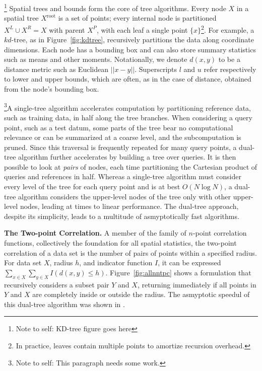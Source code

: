 \documentclass[times, leqno,twocolumn]{article}
\newcommand{\authornote}[1]{\footnote{Note to self: #1}}
\newcommand{\union}{\cup}
\newcommand{\fig}[1]{Figure~\ref{fig:#1}}
\newcommand{\kdroot}[1]{#1^{\text{root}}}
\newcommand{\kdleft}[1]{#1^{\!L}}
\newcommand{\kdright}[1]{#1^{\!R}}
\newcommand{\kdparent}[1]{#1^{\!P}}
\newcommand{\dist}[2]{d(#1,#2)}
\begin{document}
\authornote{KD-tree figure goes here}
Spatial trees and bounds form the core of tree algorithms.
Every node $X$ in a spatial tree $\kdroot{X}$ is a set of points; every internal node is partitioned $\kdleft{X} \union \kdright{X} = X$ with parent $\kdparent{X}$, with each leaf a single point $\{x\}$\footnote{In practice, leaves contain multiple points to amortize recursion overhead.}.
For example, a $kd$-tree\cite{preparata_kdtrees}, as in \fig{kdtree}, recursively partitions the data along coordinate dimensions.
Each node has a bounding box and can also store summary statistics such as means and other moments.
Notationally, we denote $\dist{x}{y}$ to be a distance metric such as Euclidean $||x-y||$.
Superscripts $l$ and $u$ refer respectively to lower and upper bounds, which are often, as in the case of distance, obtained from the node's bounding box.

\authornote{This paragraph needs some work.}A single-tree algorithm accelerates computation by partitioning reference data, such as training data, in half along the tree branches.
When considering a query point, such as a test datum, some parts of the tree bear no computational relevance or can be summarized at a coarse level, and the subcomputation is pruned.
Since this traversal is frequently repeated for many query points, a dual-tree algorithm further accelerates by building a tree over queries.
It is then possible to look at {\it pairs} of nodes, each time partitioning the Cartesian product of queries and references in half.
Whereas a single-tree algorithm must consider every level of the tree for each query point and is at best $O(N \log N)$, a dual-tree algorithm considers the upper-level nodes of the tree only with other upper-level nodes, leading at times to linear performance.
The dual-tree approach, despite its simplicity, leads to a multitude of asmyptotically fast algorithms.

{\bf The Two-point Correlation.}
A member of the family of $n$-point correlation functions, collectively the foundation for all spatial statistics, the two-point correlation of a data set is the number of pairs of points within a specified radius.
For data set $X$, radius $h$, and indicator function $I$, it can be expressed
$\sum_{x \in X} \sum_{y \in X} I(d(x, y) \leq h)$.
Figure~\ref{fig:allnntpc} shows a formulation that recursively considers a subset pair $Y$ and $X$, returning immediately if all points in $Y$ and $X$ are completely inside or outside the radius.
The asmyptotic speedul of this dual-tree algorithm was shown in \cite{gray_nips}.
\end{document}
